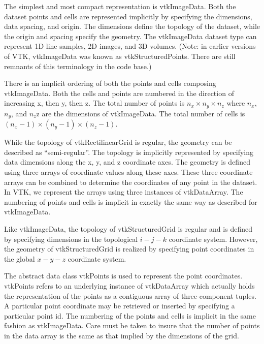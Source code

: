 \begin{description}[leftmargin=0cm,labelindent=0cm]

\item[vtkImageData.\index{image data!representation|(}] The simplest and most compact representation is vtkImageData. Both the dataset points and cells are represented implicitly by specifying the dimensions, data spacing, and origin. The dimensions define the topology of the dataset, while the origin and spacing specify the geometry. The vtkImageData dataset type can represent 1D line samples, 2D images, and 3D volumes. (Note: in earlier versions of VTK, vtkImageData was known as vtkStructuredPoints. There are still remnants of this terminology in the code base.)

There is an implicit ordering of both the points and cells composing vtkImageData. Both the cells and points are numbered in the direction of increasing x, then y, then z. The total number of points is $n_x \times n_y \times n_z$ where $n_x$, $n_y$, and $n_z$z are the dimensions of vtkImageData. The total number of cells is $(n_x - 1) \times  (n_y - 1) \times (n_z - 1)$.

\item[vtkRectilinearGrid.\index{rectilinear grid!representation|(}] While the topology of vtkRectilinearGrid is regular, the geometry can be described as ``semi-regular''. The topology is implicitly represented by specifying data dimensions along the x, y, and z coordinate axes. The geometry is defined using three arrays of coordinate values along these axes. These three coordinate arrays can be combined to determine the coordinates of any point in the dataset. In VTK, we represent the arrays using three instances of vtkDataArray. The numbering of points and cells is implicit in exactly the same way as described for vtkImageData.

\item[vtkStructuredGrid.\index{structured grid!representation|(}] Like vtkImageData, the topology of vtkStructuredGrid is regular and is defined by specifying dimensions in the topological $i-j-k$ coordinate system. However, the geometry of vtkStructuredGrid is realized by specifying point coordinates in the global $x-y-z$ coordinate system.

The abstract data class vtkPoints is used to represent the point coordinates. vtkPoints refers to an underlying instance of vtkDataArray which actually holds the representation of the points as a contiguous array of three-component tuples. A particular point coordinate may be retrieved or inserted by specifying a particular point id. The numbering of the points and cells is implicit in the same fashion as vtkImageData. Care must be taken to insure that the number of points in the data array is the same as that implied by the dimensions of the grid.


\end{description}
